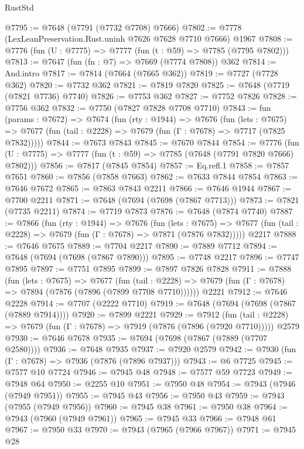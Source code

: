 \begin{lexlean}{RustStd}
\begin{coremodule}
@7795 := @7648 (@7791 (@7732 @7708) @7666)
@7802 := @7778 (LexLeanPreservation.Rust.uninh @7626 @7628 @7710 @7666) @1967
@7808 := @7776 (fun (U : @7775) => @7777 (fun (t : @59) => @7785 (@7795 @7802)))
@7813 := @7647 (fun (fn : @7) => @7669 (@7774 @7808)) @362
@7814 := And.intro
@7817 := @7814 (@7664 (@7665 @362))
@7819 := @7727 (@7728 @362)
@7820 := @7732 @362
@7821 := @7819 @7820
@7825 := @7648 (@7719 (@7821 @7736) @7740)
@7826 := @7753 @362
@7827 := @7752 @7826
@7828 := @7756 @362
@7832 := @7750 (@7827 @7828 @7708 @7710)
@7843 := fun (params : @7672) =>
  @7674
    (fun (rty : @1944) =>
    @7676
      (fun (lets : @7675) =>
      @7677 (fun (tail : @2228) => @7679 (fun (Γ : @7678) => @7717 (@7825 @7832)))))
@7844 := @7673 @7843
@7845 := @7670 @7844
@7854 := @7776 (fun (U : @7775) => @7777 (fun (t : @59) => @7785 (@7648 (@7791 @7820 @7666) @7802)))
@7856 := @7817 (@7845 @7854)
@7857 := Eq.refl.{1}
@7858 := @7857 @7651
@7860 := @7856 (@7858 @7663)
@7862 := @7633 @7844 @7854
@7863 := @7646 @7672
@7865 := @7863 @7843 @2211
@7866 := @7646 @1944
@7867 := @7700 @2211
@7871 := @7648 (@7694 (@7698 (@7867 @7713)))
@7873 := @7821 (@7735 @2211)
@7874 := @7719 @7873
@7876 := @7648 (@7874 @7740)
@7887 := @7866
    (fun (rty : @1944) =>
    @7676
      (fun (lets : @7675) =>
      @7677 (fun (tail : @2228) => @7679 (fun (Γ : @7678) => @7871 (@7876 @7832)))))
    @2217
@7888 := @7646 @7675
@7889 := @7704 @2217
@7890 := @7889 @7712
@7894 := @7648 (@7694 (@7698 (@7867 @7890)))
@7895 := @7748 @2217
@7896 := @7747 @7895
@7897 := @7751 @7895
@7899 := @7897 @7826 @7828
@7911 := @7888
    (fun (lets : @7675) =>
    @7677
      (fun (tail : @2228) => @7679 (fun (Γ : @7678) => @7894 (@7876 (@7896 (@7899 @7708 @7710))))))
    @2221
@7912 := @7646 @2228
@7914 := @7707 (@2222 @7710)
@7919 := @7648 (@7694 (@7698 (@7867 (@7889 @7914))))
@7920 := @7899 @2221
@7929 := @7912
    (fun (tail : @2228) => @7679 (fun (Γ : @7678) => @7919 (@7876 (@7896 (@7920 @7710)))))
    @2579
@7930 := @7646 @7678
@7935 := @7694 (@7698 (@7867 (@7889 (@7707 @2580))))
@7936 := @7648 @7935
@7937 := @7920 @2579
@7942 := @7930 (fun (Γ : @7678) => @7936 (@7876 (@7896 @7937)))
@7943 := @6 @7725
@7945 := @7577 @10 @7724
@7946 := @7945 @48
@7948 := @7577 @59 @7723
@7949 := @7948 @64
@7950 := @2255 @10
@7951 := @7950 @48
@7954 := @7943 (@7946 (@7949 @7951))
@7955 := @7945 @43
@7956 := @7950 @43
@7959 := @7943 (@7955 (@7949 @7956))
@7960 := @7945 @38
@7961 := @7950 @38
@7964 := @7943 (@7960 (@7949 @7961))
@7965 := @7945 @33
@7966 := @7948 @61
@7967 := @7950 @33
@7970 := @7943 (@7965 (@7966 @7967))
@7971 := @7945 @28

\end{coremodule}
\end{lexlean}
